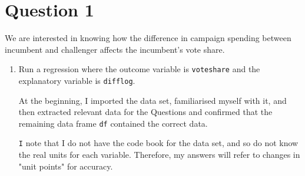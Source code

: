 \documentclass[12pt,letterpaper]{article}
\begin{document}
\section*{Question 1}
\vspace{.25cm}
\noindent We are interested in knowing how the difference in campaign spending between incumbent and challenger affects the incumbent's vote share. 
	\begin{enumerate}
		\item Run a regression where the outcome variable is \texttt{voteshare} and the explanatory variable is \texttt{difflog}.
		
		At the beginning, I imported the data set, familiarised myself with it, and then extracted relevant data for the Questions and confirmed that the remaining data frame \texttt{df} contained the correct data.
		
			
		
		\texttt I note that I do not have the code book for the data set, and so do not know the real units for each variable. Therefore, my answers will refer to changes in "unit points" for accuracy.
		
			
		

\end{enumerate}
\end{document}
